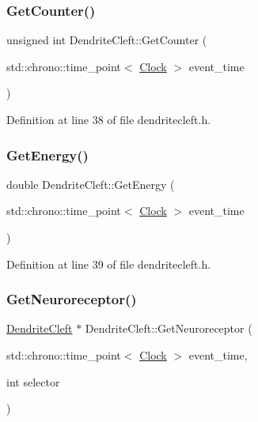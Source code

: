 \subsubsection{\texorpdfstring{Get\+Counter()}{GetCounter()}}
{\footnotesize\ttfamily unsigned int Dendrite\+Cleft\+::\+Get\+Counter (\begin{DoxyParamCaption}\item[{std\+::chrono\+::time\+\_\+point$<$ \mbox{\hyperlink{universe_8h_a0ef8d951d1ca5ab3cfaf7ab4c7a6fd80}{Clock}} $>$}]{event\+\_\+time }\end{DoxyParamCaption})\hspace{0.3cm}{\ttfamily [inline]}}



Definition at line 38 of file dendritecleft.\+h.

\mbox{\label{class_dendrite_cleft_ad673df32db3982b3df745a55bf527834}} 
\subsubsection{\texorpdfstring{Get\+Energy()}{GetEnergy()}}
{\footnotesize\ttfamily double Dendrite\+Cleft\+::\+Get\+Energy (\begin{DoxyParamCaption}\item[{std\+::chrono\+::time\+\_\+point$<$ \mbox{\hyperlink{universe_8h_a0ef8d951d1ca5ab3cfaf7ab4c7a6fd80}{Clock}} $>$}]{event\+\_\+time }\end{DoxyParamCaption})\hspace{0.3cm}{\ttfamily [inline]}}



Definition at line 39 of file dendritecleft.\+h.

\mbox{\label{class_dendrite_cleft_a5eb3a8f143f63b852b8f5e245d385519}} 
\subsubsection{\texorpdfstring{Get\+Neuroreceptor()}{GetNeuroreceptor()}}
{\footnotesize\ttfamily \mbox{\hyperlink{class_dendrite_cleft}{Dendrite\+Cleft}} $\ast$ Dendrite\+Cleft\+::\+Get\+Neuroreceptor (\begin{DoxyParamCaption}\item[{std\+::chrono\+::time\+\_\+point$<$ \mbox{\hyperlink{universe_8h_a0ef8d951d1ca5ab3cfaf7ab4c7a6fd80}{Clock}} $>$}]{event\+\_\+time,  }\item[{int}]{selector }\end{DoxyParamCaption})}



